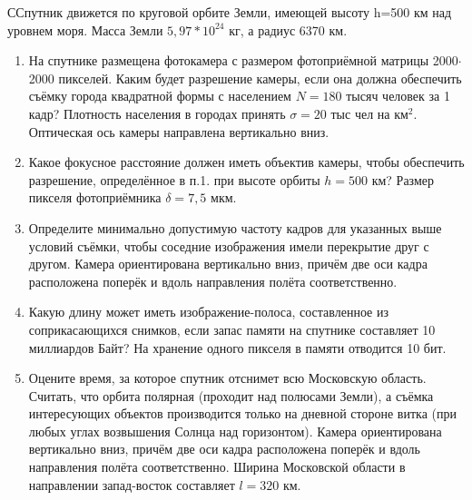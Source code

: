 
ССпутник движется по круговой орбите Земли, имеющей высоту h=500 км над уровнем моря. Масса Земли 
$5,97*10^{24}$ кг, а радиус 6370 км.

\begin{enumerate}
    \item На спутнике размещена фотокамера с размером фотоприёмной матрицы 2000$\cdot$2000 пикселей. Каким будет 
    разрешение камеры, если она должна обеспечить съёмку города квадратной формы с населением $N=180$ тысяч 
    человек  за 1 кадр? Плотность населения в городах принять $\sigma=20$ тыс чел на км$^2$. Оптическая ось 
    камеры направлена вертикально вниз.
    \item Какое фокусное расстояние должен иметь объектив камеры, чтобы обеспечить разрешение, определённое в п.1. 
    при высоте орбиты  $h=500$ км? Размер пикселя фотоприёмника $\delta=7,5$ мкм.
    \item Определите минимально допустимую частоту кадров для указанных выше условий съёмки, чтобы соседние 
    изображения имели перекрытие друг с другом. Камера ориентирована вертикально вниз, причём две оси кадра 
    расположена поперёк и вдоль направления полёта соответственно.
    \item Какую длину может иметь изображение-полоса, составленное из соприкасающихся снимков, если запас 
    памяти на спутнике составляет 10 миллиардов Байт?  На хранение одного пикселя в памяти отводится 10 бит.
    \item Оцените время, за которое спутник отснимет всю Московскую область. Считать, что орбита полярная 
    (проходит над полюсами Земли), а съёмка интересующих объектов производится только на дневной стороне витка 
    (при любых углах возвышения Солнца над горизонтом). Камера ориентирована вертикально вниз, причём две оси 
    кадра расположена поперёк и вдоль направления полёта соответственно. Ширина Московской области в направлении 
    запад-восток составляет $l=320$ км.
\end{enumerate}
